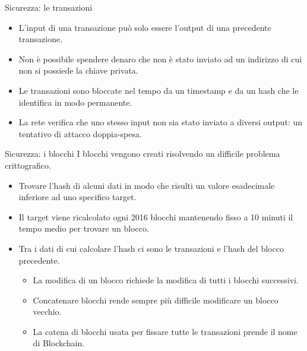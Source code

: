 \documentclass[italian]{beamer}
\begin{document}
\begin{frame}{Sicurezza: le transazioni}
\begin{itemize}
    \item L'input di una transazione può solo essere l'output di una precedente transazione.
    \item Non è possibile spendere denaro che non è stato inviato ad un indirizzo di cui non si possiede la chiave privata.
    \item Le transazioni sono bloccate nel tempo da un timestamp e da un hash che le identifica in modo permanente.
    \item La rete verifica che uno stesso input non sia stato inviato a diversi output: un tentativo di attacco doppia-spesa.
\end{itemize}
\end{frame}

\begin{frame}{Sicurezza: i blocchi}
I blocchi vengono creati risolvendo un difficile problema crittografico.
\begin{itemize}
  \item Trovare l'hash di alcuni dati in modo che risulti un valore esadecimale inferiore ad uno specifico target.
  \item Il target viene ricalcolato ogni 2016 blocchi mantenendo fisso a 10 minuti il tempo medio per trovare un blocco.
  \item Tra i dati di cui calcolare l'hash ci sono le transazioni e l'hash del blocco precedente.
  \begin{itemize}
    \item La modifica di un blocco richiede la modifica di tutti i blocchi successivi.
    \item Concatenare blocchi rende sempre più difficile modificare un blocco vecchio.
    \item La catena di blocchi usata per fissare tutte le transazioni prende il nome di Blockchain.
  \end{itemize}
\end{itemize}
\end{frame}

\end{document}
